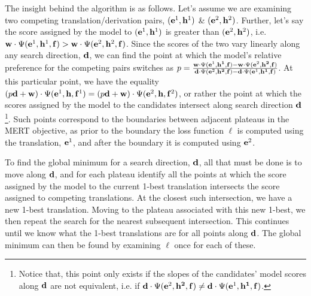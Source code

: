 \documentclass[11pt]{article}
\begin{document}
The insight behind the algorithm is as follows. Let's assume we are examining two competing translation/derivation pairs, \mbox{$({\bf e}^1, {\bf h}^1)$} \& \mbox{$({\bf e}^2, {\bf h}^2)$}. Further, let's say the score assigned by the model to \mbox{$({\bf e}^1, {\bf h}^1)$} is greater than  \mbox{$({\bf e}^2, {\bf h}^2)$}, i.e. \mbox{\mbox{${\bf w} \cdot \Psi({\bf e}^1, {\bf h}^1, {\bf f}) > {\bf w} \cdot \Psi({\bf e}^2, {\bf h}^2, {\bf f})$}}. Since the scores of the two vary linearly along any search direction, \mbox{${\bf d}$}, we can find the point at which the model's relative preference for the competing pairs switches as \mbox{$p = \frac{{\bf w} \cdot \Psi({\bf e}^1, {\bf h^1}, {\bf f}) - {\bf w} \cdot \Psi({\bf e}^2, {\bf h^2}, {\bf f})}{{\bf d} \cdot \Psi({\bf e}^2, {\bf h^2}, {\bf f}) - {\bf d} \cdot \Psi({\bf e}^1, {\bf h^1}, {\bf f})}$}. At this particular point, we have the equality \mbox{$(p{\bf d} + {\bf w}) \cdot \Psi({\bf e}^1, {\bf h}, {\bf f}^1) = (p{\bf d} + {\bf w}) \cdot \Psi({\bf e}^2, {\bf h}, {\bf f}^2)$}, or rather the point at which the scores assigned by the model to the candidates intersect along search direction \mbox{${\bf d}$}\footnote{Notice that, this point only exists if the slopes of the candidates' model scores along \mbox{${\bf d}$} are not equivalent, i.e. if \mbox{${\bf d} \cdot \Psi({\bf e}^2, {\bf h^2}, {\bf f}) \neq {\bf d} \cdot \Psi({\bf e}^1, {\bf h^1}, {\bf f})$}.}. Such points correspond to the boundaries between adjacent plateaus in the MERT objective, as prior to the boundary the loss function \mbox{$\ell$} is computed using the translation, \mbox{${\bf e}^1$}, and after the boundary it is computed using \mbox{${\bf e}^2$}. 

To find the global minimum for a search direction, \mbox{${\bf d}$}, all that must be done is to move along \mbox{${\bf d}$}, and for each plateau identify all the points at which the score assigned by the model to the current 1-best translation intersects the score assigned to competing translations. At the closest such intersection, we have a new 1-best translation. Moving to the plateau associated with this new 1-best, we then repeat the search for the nearest subsequent intersection. This continues until we know what the 1-best translations are for all points along \mbox{${\bf d}$}. The global minimum can then be found by examining \mbox{$\ell$} once for each of these.
\end{document}
